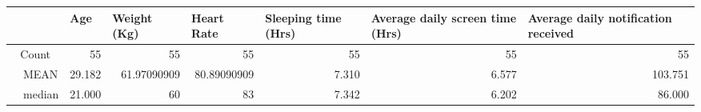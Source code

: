 \begin{table}[ht]
    \begin{adjustbox}{width = \textwidth, center}
        \begin{tabular}{|cl|r|r|r|r|r|r|}
        \hline
        \multicolumn{2}{|l|}{}                                                                                                                        & \multicolumn{1}{l|}{\cellcolor[HTML]{FFE599}Age} & \multicolumn{1}{l|}{\cellcolor[HTML]{FFE599}Weight (Kg)} & \multicolumn{1}{l|}{\cellcolor[HTML]{FFE599}Heart Rate} & \multicolumn{1}{l|}{\cellcolor[HTML]{FFE599}Sleeping time (Hrs)} & \multicolumn{1}{l|}{\cellcolor[HTML]{FFE599}Average daily screen time (Hrs)} & \multicolumn{1}{l|}{\cellcolor[HTML]{FFE599}Average daily notification received} \\ \hline
        \multicolumn{2}{|c|}{\cellcolor[HTML]{FFFF00}Count}                                                                                           & 55                                               & 55                                                       & 55                                                      & 55                                                               & 55                                                                           & 55                                                                               \\ \hline
        \multicolumn{1}{|c|}{}                                         & \cellcolor[HTML]{B6D7A8}MEAN                                                 & 29.182                                           & 61.97090909                                              & 80.89090909                                             & 7.310                                                            & 6.577                                                                        & 103.751                                                                          \\ \cline{2-8} 
        \multicolumn{1}{|c|}{}                                         & \cellcolor[HTML]{B6D7A8}median                                               & 21.000                                           & 60                                                       & 83                                                      & 7.342                                                            & 6.202                                                                        & 86.000                                                                           \\ \cline{2-8} 

\end{tabular}
\end{adjustbox}
\end{table}
